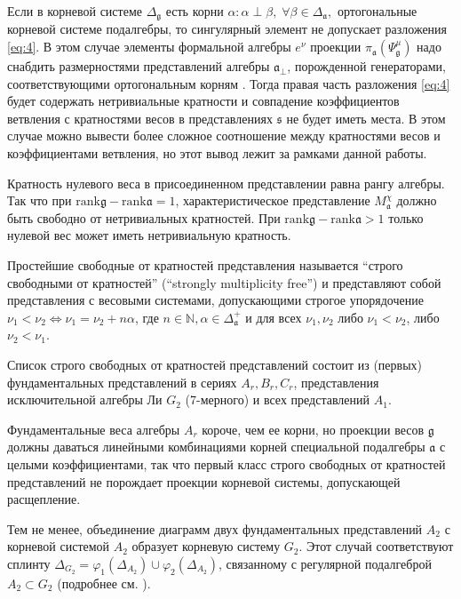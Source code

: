 \documentclass[12pt]{article}
\newcommand{\pia}{\pi_{\mathfrak{a}}}
\newcommand{\gf}{\mathfrak{g}}
\newcommand{\af}{\mathfrak{a}}
\newcommand{\afb}{\mathfrak{a}_{\bot}}
\newcommand{\sfr}{\mathfrak{s}}
\begin{document}
Если в корневой системе  $\Delta_{\gf}$ есть корни $\alpha: \alpha\perp \beta,\; \forall \beta\in
\Delta_{\af},$ ортогональные корневой системе подалгебры, то сингулярный элемент не допускает
разложения \ref{eq:4}.  В этом случае элементы формальной алгебры $e^{\nu}$ проекции
$\pia\left(\Psi^{\mu}_{\gf}\right)$ надо снабдить размерностями представлений алгебры $\afb$,
порожденной генераторами, соответствующими ортогональным корням \cite{2010arXiv1007.0318L}. Тогда
правая часть разложения  \ref{eq:4} будет содержать нетривиальные кратности и совпадение
коэффициентов ветвления с кратностями весов в представлениях  $\sfr$ не будет иметь места. В
этом случае можно вывести более сложное соотношение между кратностями весов и коэффициентами
ветвления, но этот вывод лежит за рамками данной работы. 

Кратность нулевого веса в присоединенном представлении равна рангу алгебры. Так что при 
$\mathrm{rank}\gf-\mathrm{rank}\af=1$, характеристическое представление  $M^{\chi}_{\af}$ должно
быть свободно от нетривиальных кратностей.  При $\mathrm{rank}\gf-\mathrm{rank}\af>1$ только нулевой
вес может иметь нетривиальную кратность. 

Простейшие свободные от кратностей представления называется ``строго свободными от кратностей''
 (``strongly multiplicity free'') \cite{lehrer2006strongly} и представляют собой представления с
 весовыми системами, допускающими строгое упорядочение $\nu_{1}<\nu_{2} \Leftrightarrow
 \nu_{1}=\nu_{2}+n \alpha$, где $n\in
\mathbb{N}, \alpha\in \Delta^{+}_{\af}$ и для всех $\nu_{1},\nu_{2}$ либо $\nu_{1}<\nu_{2}$, либо
$\nu_{2}<\nu_{1}$.

Список строго свободных от кратностей представлений состоит из (первых) фундаментальных
представлений в сериях $A_{r}, B_{r}, C_{r}$, представления исключительной алгебры Ли $G_{2}$
(7-мерного) и всех представлений $A_{1}$. 

Фундаментальные веса алгебры $A_{r}$ короче, чем ее корни, но проекции весов $\gf$ должны даваться
линейными комбинациями корней специальной подалгебры  $\af$ с целыми коэффициентами, так что первый
класс строго свободных от кратностей представлений не порождает проекции корневой системы,
допускающей расщепление.

Тем не менее, объединение диаграмм двух фундаментальных представлений  $A_{2}$ с корневой системой
$A_{2}$ образует корневую систему $G_{2}$. Этот случай соответствуют сплинту
$\Delta_{G_{2}}=\varphi_{1}( \Delta_{A_{2}})\cup \varphi_{2}(\Delta_{A_{2}})$, связанному с
регулярной подалгеброй $A_{2}\subset G_{2}$ (подробнее см. \cite{2011arXiv1111.6787L}).
\end{document}
